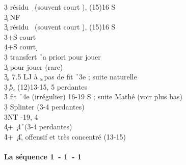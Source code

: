 \documentclass[a4paper]{article}
\begin{document}
\begin{bidtable}
3\d \> résidu \d\ (souvent court \s ), (15)16 S\+\\
3\c \> NF\-\\
3\c \> résidu \s\ (souvent court \d ), (15)16 S\\
3\s {}+S court \s \\
4\d {}+S court \d \-\\
3\d \> transfert \h\ a priori pour jouer\\
3\c \> pour jouer (rare)\-\\
3\c {}, 7.5 LJ à \c , pas de fit \h\ 3e ; suite naturelle\\
3\d {}\c\ 5\d , (12)13-15, 5 perdantes\\
3\h \> fit \h\ 4e (irrégulier) 16-19 S ; suite Mathé (voir plus bas)\\
3\d \> Splinter (3-4 perdantes)\\
3NT -19, 4\h \\
4\c {}+ \c\ 4\h\ (3-4 perdantes)\\
4\h {}+ \c\ 4\h , offensif et très concentré (13-15)
\end{bidtable}

\paragraph{La séquence 1\pdfc\ - 1\pdfd\ - 1\pdfh}
\end{document}
